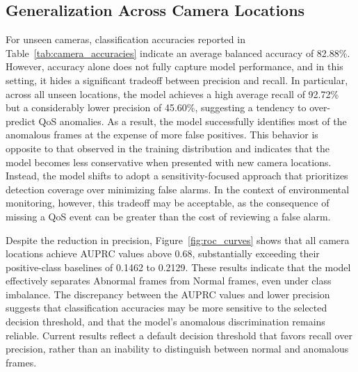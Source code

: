 \documentclass{article}
\begin{document}
\subsection{Generalization Across Camera Locations}

For unseen cameras, classification accuracies reported in Table~\ref{tab:camera_accuracies} indicate an average balanced accuracy of 82.88\%. However, accuracy alone does not fully capture model performance, and in this setting, it hides a significant tradeoff between precision and recall. In particular, across all unseen locations, the model achieves a high average recall of 92.72\% but a considerably lower precision of 45.60\%, suggesting a tendency to over-predict \ac{QoS} anomalies. As a result, the model successfully identifies most of the anomalous frames at the expense of more false positives. This behavior is opposite to that observed in the training distribution and indicates that the model becomes less conservative when presented with new camera locations. Instead, the model shifts to adopt a sensitivity-focused approach that prioritizes detection coverage over minimizing false alarms. In the context of environmental monitoring, however, this tradeoff may be acceptable, as the consequence of missing a \ac{QoS} event can be greater than the cost of reviewing a false alarm. 

Despite the reduction in precision, Figure~\ref{fig:roc_curves} shows that all camera locations achieve \ac{AUPRC} values above 0.68, substantially exceeding their positive-class baselines of 0.1462 to 0.2129. These results indicate that the model effectively separates Abnormal frames from Normal frames, even under class imbalance. The discrepancy between the \ac{AUPRC} values and lower precision suggests that classification accuracies may be more sensitive to the selected decision threshold, and that the model's anomalous discrimination remains reliable. Current results reflect a default decision threshold that favors recall over precision, rather than an inability to distinguish between normal and anomalous frames. 
\end{document}
